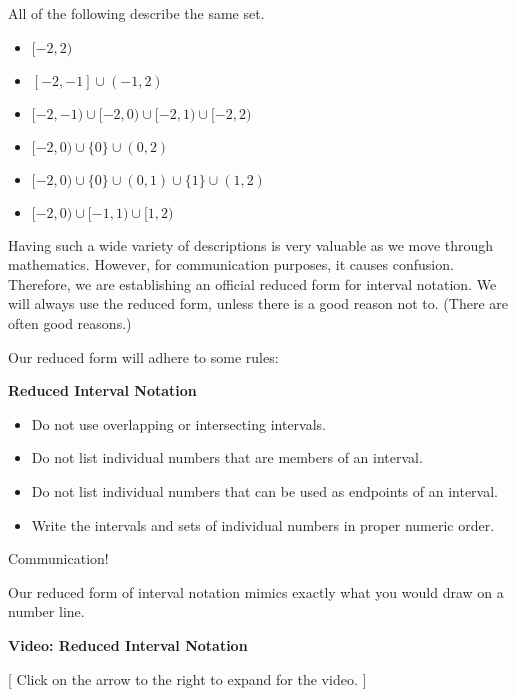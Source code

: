 \documentclass{ximera}
\begin{document}
All of the following describe the same set.

\begin{itemize}
\item $[-2, 2)$
\item $[-2, -1] \cup (-1, 2)$
\item $[-2, -1) \cup [-2, 0) \cup [-2, 1) \cup [-2, 2)$
\item $[-2, 0) \cup \{ 0 \} \cup (0, 2)$
\item $[-2, 0) \cup \{ 0 \} \cup (0, 1) \cup \{ 1 \} \cup (1, 2)$
\item $[-2, 0) \cup [-1, 1) \cup [1, 2)$
\end{itemize}

Having such a wide variety of descriptions is very valuable as we move through mathematics.  However, for communication purposes, it causes confusion. Therefore, we are establishing an official reduced form for interval notation.  We will always use the reduced form, unless there is a good reason not to.  (There are often good reasons.)

Our reduced form will adhere to some rules:





\begin{notation} \textbf{\textcolor{blue!75!black}{Reduced Interval Notation}} \\

\begin{itemize}
\item Do not use overlapping or intersecting intervals.
\item Do not list individual numbers that are members of an interval.
\item Do not list individual numbers that can be used as endpoints of an interval.
\item Write the intervals and sets of individual numbers in proper numeric order.
\end{itemize}

\end{notation}
Communication!

Our reduced form of interval notation mimics exactly what you would draw on a number line.







\begin{explanation} \textbf{Video: Reduced Interval Notation}

[ Click on the arrow to the right to expand for the video. ]
\begin{expandable} 

\begin{center}
\end{center}

\end{expandable}
\end{explanation}
\end{document}
